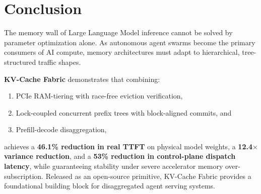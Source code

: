 \documentclass[10pt,twocolumn,letterpaper]{article}
\begin{document}
\section{Conclusion}
The memory wall of Large Language Model inference cannot be solved by parameter optimization alone. As autonomous agent swarms become the primary consumers of AI compute, memory architectures must adapt to hierarchical, tree-structured traffic shapes.

\textbf{KV-Cache Fabric} demonstrates that combining:
\begin{enumerate}
    \item PCIe RAM-tiering with race-free eviction verification,
    \item Lock-coupled concurrent prefix trees with block-aligned commits, and
    \item Prefill-decode disaggregation,
\end{enumerate}
achieves a \textbf{46.1\% reduction in real TTFT} on physical model weights, a \textbf{12.4$\times$ variance reduction}, and a \textbf{53\% reduction in control-plane dispatch latency}, while guaranteeing stability under severe accelerator memory over-subscription. Released as an open-source primitive, KV-Cache Fabric provides a foundational building block for disaggregated agent serving systems.



\end{document}
